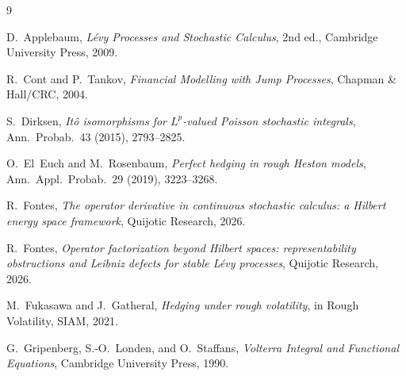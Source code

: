 \documentclass[11pt,a4paper]{article}
\theoremstyle{plain}
\theoremstyle{definition}
\theoremstyle{remark}
\begin{document}
\begin{thebibliography}{9}

D.~Applebaum, \emph{L\'evy Processes and Stochastic Calculus},
2nd ed., Cambridge University Press, 2009.

R.~Cont and P.~Tankov, \emph{Financial Modelling with Jump
Processes}, Chapman \& Hall/CRC, 2004.

S.~Dirksen, \emph{It\^o isomorphisms for $L^p$-valued Poisson
stochastic integrals}, Ann.\ Probab.\ 43 (2015), 2793--2825.

O.~El~Euch and M.~Rosenbaum, \emph{Perfect hedging in rough
Heston models}, Ann.\ Appl.\ Probab.\ 29 (2019), 3223--3268.

R.~Fontes, \emph{The operator derivative in continuous stochastic
calculus: a Hilbert energy space framework}, Quijotic Research,
2026.

R.~Fontes, \emph{Operator factorization beyond Hilbert spaces:
representability obstructions and Leibniz defects for stable
L\'evy processes}, Quijotic Research, 2026.

M.~Fukasawa and J.~Gatheral, \emph{Hedging under rough
volatility}, in Rough Volatility, SIAM, 2021.

G.~Gripenberg, S.-O.~Londen, and O.~Staffans,
\emph{Volterra Integral and Functional Equations},
Cambridge University Press, 1990.

\end{thebibliography}
\end{document}
